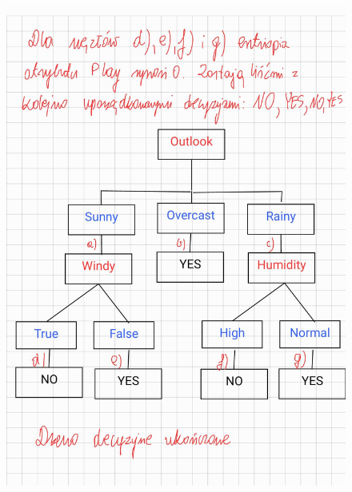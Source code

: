 \documentclass{article}
\begin{document}
\begin{figure}[H]
    \centering
    \includegraphics[width=\textwidth]{tree9.jpg}
\end{figure}
\end{document}
